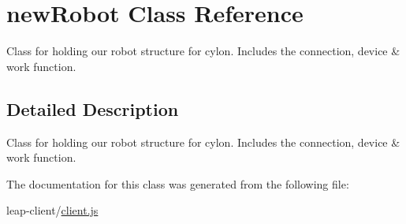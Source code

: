 \hypertarget{classnewRobot}{\section{new\+Robot Class Reference}
\label{classnewRobot}
}


Class for holding our robot structure for cylon. Includes the connection, device \& work function.  




\subsection{Detailed Description}
Class for holding our robot structure for cylon. Includes the connection, device \& work function. 

The documentation for this class was generated from the following file\+:\begin{DoxyCompactItemize}
\item 
leap-\/client/\hyperlink{client_8js}{client.\+js}\end{DoxyCompactItemize}
